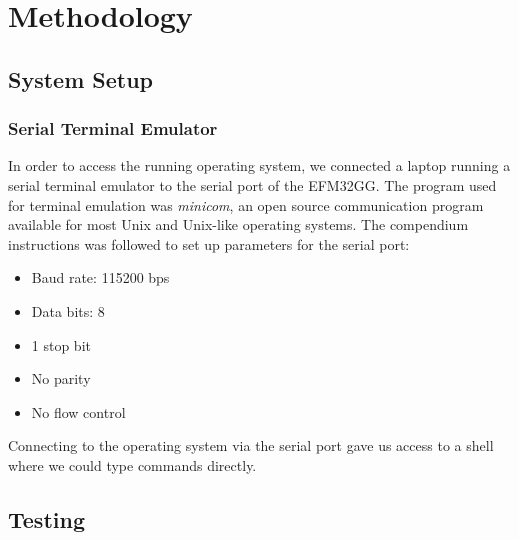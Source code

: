 \chapter{Methodology}

\section{System Setup}

\subsection{Serial Terminal Emulator}
In order to access the running operating system, we connected a laptop running a serial terminal emulator to the serial port of the EFM32GG. The program used for terminal emulation was \emph{minicom}, an open source communication program available for most Unix and Unix-like operating systems.\cite{minicom-man-page} The compendium instructions was followed to set up parameters for the serial port:
\begin{itemize}
  \item Baud rate: 115200 bps
  \item Data bits: 8
  \item 1 stop bit
  \item No parity
  \item No flow control
\end{itemize}
Connecting to the operating system via the serial port gave us access to a shell where we could type commands directly.


\section{Testing}
